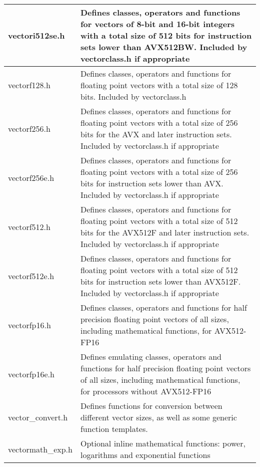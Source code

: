 \documentclass[vcl_manual.tex]{subfiles}
\begin{document}
\begin{longtable}[l]{|p{40mm}|p{100mm}|}
vectori512se.h & Defines classes, operators and functions for vectors of 8-bit and 16-bit integers  with a total size of 512 bits for instruction sets lower than
AVX512BW. Included by vectorclass.h if appropriate \\ \hline

vectorf128.h & Defines classes, operators and functions for floating point vectors with a total size of 128 bits. Included by vectorclass.h \\ \hline

vectorf256.h & Defines classes, operators and functions for floating point vectors with a total size of 256 bits for the AVX and later instruction sets. Included by vectorclass.h if appropriate \\ \hline

vectorf256e.h & Defines classes, operators and functions for floating point vectors with a total size of 256 bits for instruction sets lower than AVX. Included by vectorclass.h if appropriate \\ \hline

vectorf512.h & Defines classes, operators and functions for floating point vectors with a total size of 512 bits for the AVX512F and later instruction sets. Included by vectorclass.h if appropriate \\ \hline

vectorf512e.h & Defines classes, operators and functions for floating point vectors with a total size of 512 bits for instruction sets lower than AVX512F. Included by vectorclass.h if appropriate \\ \hline

vectorfp16.h & Defines classes, operators and functions for half precision floating point vectors of all sizes, including mathematical functions, for AVX512-FP16 \\ \hline

vectorfp16e.h & Defines emulating classes, operators and functions for half precision floating point vectors of all sizes, including mathematical functions, for processors without AVX512-FP16 \\ \hline

vector\_convert.h & Defines functions for conversion between different vector sizes, as well as some generic function templates. \\ \hline

vectormath\_exp.h & Optional inline mathematical functions: power, logarithms and exponential functions \\ \hline


\end{longtable}
\end{document}
